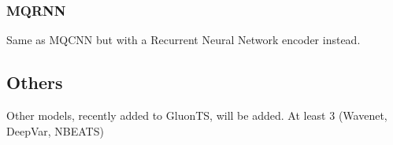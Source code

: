 \subsubsection{MQRNN} \label{descr_mqrnn}
Same as MQCNN but with a Recurrent Neural Network encoder instead.

\subsection{Others}

Other models, recently added to GluonTS,  will be added. At least 3 (Wavenet, DeepVar, NBEATS)
